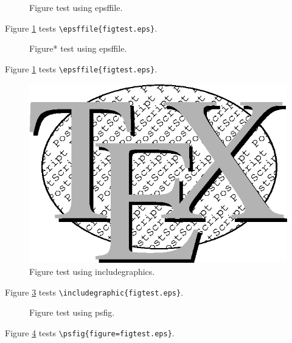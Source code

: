 \documentclass{article}
\begin{document}
\begin{figure}
\caption{Figure test using epsffile.} 
\label{figure1}
\end{figure}

Figure \ref{figure1} tests \verb#\epsffile{figtest.eps}#.

\begin{figure}
\caption{Figure* test using epsffile.} 
\label{figure1a}
\end{figure}

Figure \ref{figure1} tests \verb#\epsffile{figtest.eps}#.

\begin{figure}
\includegraphics{figtest.eps}
\caption{Figure test using includegraphics.} 
\label{figure2}
\end{figure}

Figure \ref{figure2} tests \verb#\includegraphic{figtest.eps}#.

\begin{figure}
\caption{Figure test using psfig.} 
\label{figure3}
\end{figure}

Figure \ref{figure3} tests \verb#\psfig{figure=figtest.eps}#.
\end{document}
